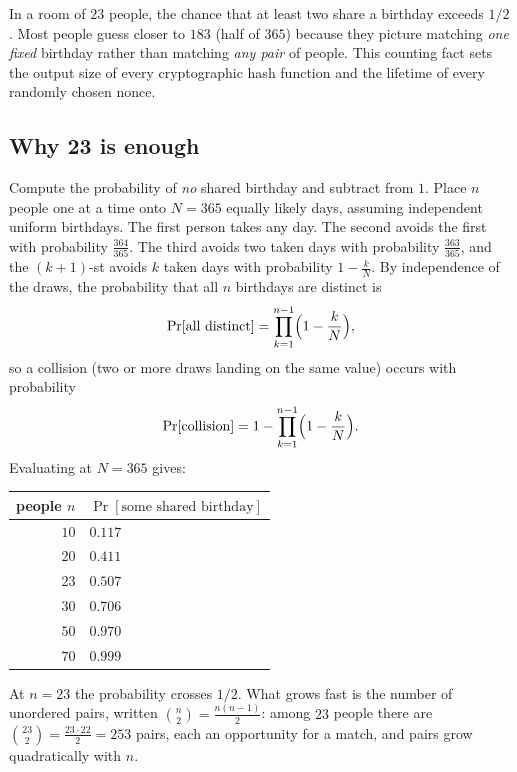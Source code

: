 In a room of $23$ people, the chance that at least two share a birthday exceeds $1/2$. Most people guess closer to $183$ (half of $365$) because they picture matching \emph{one fixed} birthday rather than matching \emph{any pair} of people. This counting fact sets the output size of every cryptographic hash function and the lifetime of every randomly chosen nonce.

\subsection{Why 23 is enough}

Compute the probability of \emph{no} shared birthday and subtract from $1$. Place $n$ people one at a time onto $N = 365$ equally likely days, assuming independent uniform birthdays. The first person takes any day. The second avoids the first with probability $\frac{364}{365}$. The third avoids two taken days with probability $\frac{363}{365}$, and the $(k+1)$-st avoids $k$ taken days with probability $1 - \frac{k}{N}$. By independence of the draws, the probability that all $n$ birthdays are distinct is
\[
  \Pr[\text{all distinct}] = \prod_{k=1}^{n-1} \Bigl(1 - \frac{k}{N}\Bigr),
\]
so a collision (two or more draws landing on the same value) occurs with probability
\[
  \Pr[\text{collision}] = 1 - \prod_{k=1}^{n-1}\Bigl(1 - \frac{k}{N}\Bigr).
\]
Evaluating at $N = 365$ gives:

\begin{center}
\begin{tabular}{rl}
\toprule
people $n$ & $\Pr[\text{some shared birthday}]$ \\
\midrule
$10$ & $0.117$ \\
$20$ & $0.411$ \\
$23$ & $0.507$ \\
$30$ & $0.706$ \\
$50$ & $0.970$ \\
$70$ & $0.999$ \\
\bottomrule
\end{tabular}
\end{center}

At $n = 23$ the probability crosses $1/2$. What grows fast is the number of unordered pairs, written $\binom{n}{2} = \frac{n(n-1)}{2}$: among $23$ people there are $\binom{23}{2} = \frac{23 \cdot 22}{2} = 253$ pairs, each an opportunity for a match, and pairs grow quadratically with $n$.

